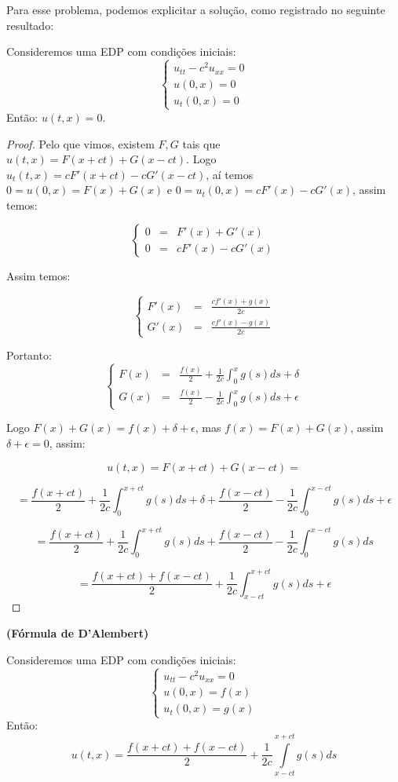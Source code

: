 \documentclass[11pt,twoside,a4paper]{book}
\begin{document}
\smallskip
\noindent
Para esse problema, podemos explicitar a solução, como registrado no seguinte resultado:

\begin{proposicao}
\noindent
Consideremos uma EDP com condições iniciais:
\[\left\{\begin{array}{cc}
     u_{tt} - c^2 u_{xx} = 0  \\
     u(0,x)  = 0 \\
     u_t (0,x) = 0
\end{array}\right.\]
Então: $u(t,x)=0$.
\end{proposicao}
\begin{proof}
Pelo que vimos, existem $F,G$ tais que $u(t,x)=F(x+ct)+G(x-ct)$. Logo $u_t(t,x)=cF'(x+ct)-cG'(x-ct)$, aí temos $0=u(0,x)=F(x)+G(x)$ e $0=u_t(0,x)=cF'(x)-cG'(x)$, assim temos:

\[
\left\{
\begin{array}{ccc}
     0 & = & F'(x)+G'(x) \\
     0 & = & cF'(x)-cG'(x)
\end{array}
\right.
\]

\noindent
Assim temos:

\[
\left\{
\begin{array}{ccc}
     F'(x) & = & \frac{cf'(x)+g(x)}{2c} \\
     G'(x) & = & \frac{cf'(x)-g(x)}{2c}
\end{array}
\right.
\]

\noindent
Portanto:
\[
\left\{
\begin{array}{ccc}
     F(x) & = & \frac{f(x)}{2} + \frac{1}{2c}\int_{0}^xg(s)ds+\delta \\
     G(x) & = & \frac{f(x)}{2} - \frac{1}{2c}\int_{0}^xg(s)ds+\epsilon
\end{array}
\right.
\]

\noindent
Logo $F(x)+G(x)=f(x)+\delta+\epsilon$, mas $f(x)=F(x)+G(x)$, assim $\delta+\epsilon=0$, assim:

\[
u(t,x)=F(x+ct)+G(x-ct)=
\]

\[
=\frac{f(x+ct)}{2} + \frac{1}{2c}\int_{0}^{x+ct}g(s)ds+\delta+\frac{f(x-ct)}{2} - \frac{1}{2c}\int_{0}^{x-ct}g(s)ds+\epsilon
\]

\[
=\frac{f(x+ct)}{2} + \frac{1}{2c}\int_{0}^{x+ct}g(s)ds+\frac{f(x-ct)}{2} - \frac{1}{2c}\int_{0}^{x-ct}g(s)ds
\]

\[
=\frac{f(x+ct)+f(x-ct)}{2} + \frac{1}{2c}\int_{x-ct}^{x+ct}g(s)ds+\epsilon
\]
\end{proof}
\begin{proposicao}

\textbf{(Fórmula de D'Alembert)}

\noindent
Consideremos uma EDP com condições iniciais:
\[\left\{\begin{array}{cc}
     u_{tt} - c^2 u_{xx} = 0  \\
     u(0,x)  =f(x) \\
     u_t (0,x) = g(x)
\end{array}\right.\]
Então:
\[\boxed{u(t,x) = \frac{f(x + ct) + f(x - ct)}{2} + \frac{1}{2c} \int\limits_{x  -ct}^{x + ct} g(s) ds} \]
\end{proposicao}
\end{document}
